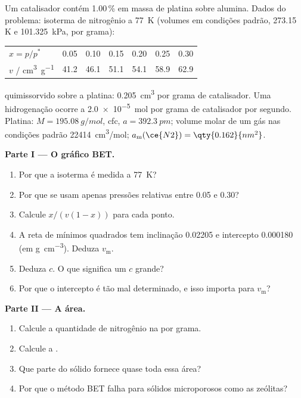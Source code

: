 \begin{problem}
\label{pb:b3:surfaces-catalysis:1}
Um catalisador contém 1.00\,\% em massa de platina sobre alumina. Dados do problema:
isoterma de nitrogênio a \qty{77}{K} (volumes em condições padrão, 273.15 K e
\qty{101.325}{kPa}, por grama):
\begin{center}\small
\begin{tabular}{lcccccc}
\hline
$x = p/p^*$ & 0.05 & 0.10 & 0.15 & 0.20 & 0.25 & 0.30 \\
$v$ / \unit{cm^3.g^{-1}} & 41.2 & 46.1 & 51.1 & 54.1 & 58.9 & 62.9 \\ \hline
\end{tabular}
\end{center}
 quimissorvido sobre a platina: \qty{0.205}{cm^3} por grama de catalisador. Uma
hidrogenação ocorre a \qty{2.0e-5}{mol} por grama de catalisador por segundo. Platina: $M = \qty{195.08}{g/mol}$, cfc,
$a = \qty{392.3}{pm}$; volume molar de um gás nas condições padrão \qty{22414}{cm^3/mol};
$a_{\mathrm m}(\ce{N2}) = \qty{0.162}{nm^2}$.

\medskip\noindent\textbf{Parte I --- O gráfico BET.}
\begin{enumerate}
  \item Por que a isoterma é medida a \qty{77}{K}?
  \item Por que se usam apenas pressões relativas entre 0.05 e 0.30?
  \item Calcule $x/(v(1 - x))$ para cada ponto.
  \item A reta de mínimos quadrados tem inclinação \num{0.02205} e intercepto \num{0.000180} (em
        \unit{g.cm^{-3}}). Deduza $v_{\mathrm m}$.
  \item Deduza $c$. O que significa um $c$ grande?
  \item Por que o intercepto é tão mal determinado, e isso importa para $v_{\mathrm m}$?
\end{enumerate}

\medskip\noindent\textbf{Parte II --- A área.}
\begin{enumerate}[resume]
  \item Calcule a quantidade de nitrogênio na  por grama.
  \item Calcule a .
  \item Que parte do sólido fornece quase toda essa área?
  \item Por que o método BET falha para sólidos microporosos como as zeólitas?
\end{enumerate}


\end{problem}
